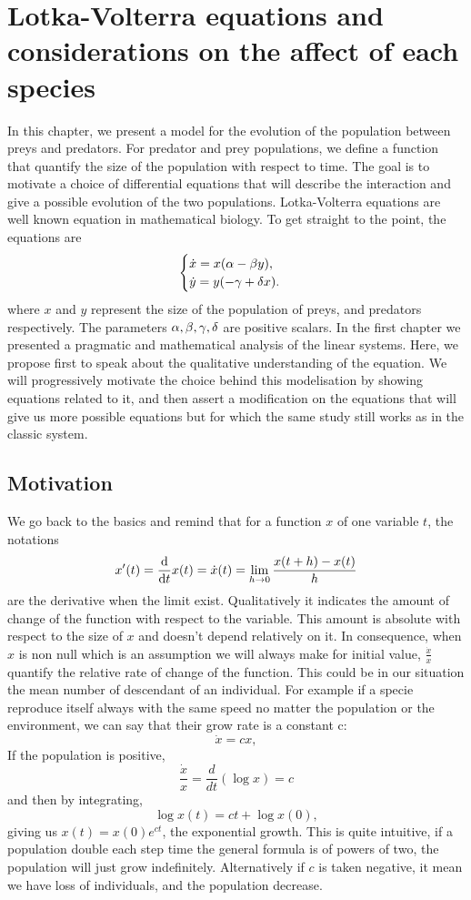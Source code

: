 \chapter{Lotka-Volterra equations and considerations on the affect of each species}

In this chapter, we present a model for the evolution of the population between preys and predators. For predator and prey populations, we define a function that quantify the size of the population with respect to time. The goal is to motivate a choice of differential equations that will describe the interaction and give a possible evolution of the two populations. Lotka-Volterra equations are well known equation in mathematical biology. To get straight to the point, the equations are
$$\begin{cases}
\dot{x} = x(\alpha-\beta y),\\  
\dot{y} = y(-\gamma + \delta x).
\end{cases}$$
where $x$ and $y$ represent the size of the population of preys, and predators respectively. The parameters $\alpha,\beta,\gamma,\delta$ are positive scalars. In the first chapter we presented a pragmatic and mathematical analysis of the linear systems. Here, we propose first to speak about the qualitative understanding of the equation. We will progressively motivate the choice behind this modelisation by showing equations related to it, and then assert a modification on the equations that will give us more possible equations but for which the same study still works as in the classic system.

\section{Motivation} \label{sec:motiv}
We go back to the basics and remind that for a function $x$ of one variable $t$, the notations
\[x'(t) = \frac{\mathrm{d}}{\mathrm{d} t}x(t) = \dot{x}(t)= \lim_{h\to0}\frac{x(t+h)-x(t)}{h}\] 
are the derivative when the limit exist. Qualitatively it indicates the amount of change of the function with respect to the variable. This amount is absolute with respect to the size of $x$ and doesn't depend relatively on it. In consequence, when $x$ is non null which is an assumption we will always make for initial value, $\frac{\dot{x}}{x}$ quantify the relative rate of change of the function. This could be in our situation the mean number of descendant of an individual. For example if a specie reproduce itself always with the same speed no matter the population or the environment, we can say that their grow rate is a constant c:
\[ \dot{x} = cx, \]
If the population is positive, 
\[ \frac{\dot{x}}{x} = \frac{d}{dt}(\log{x}) = c \]
and then by integrating,
\[ \log{x(t)} = ct + \log{x(0)}, \]
giving us $x(t) = x(0)e^{ct}$, the exponential growth. This is quite intuitive, if a population double each step time the general formula is of powers of two, the population will just grow indefinitely. Alternatively if $c$ is taken negative, it mean we have loss of individuals, and the population decrease.
 
